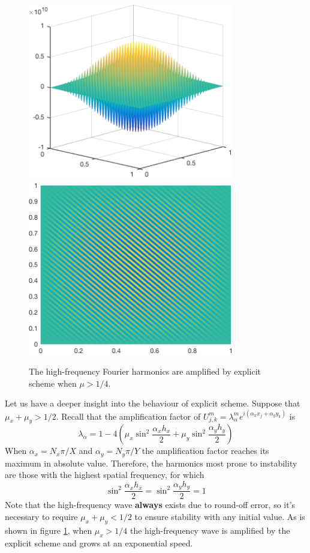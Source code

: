 \documentclass[12pt]{article}
\begin{document}
\begin{figure}[!htb]
\centerline{
	\includegraphics[width = 9cm]{explode_3D.png}
	\includegraphics[width = 9cm]{explode_flat.png}
}
\caption{The high-frequency Fourier harmonics are amplified by explicit scheme when $\mu > 1/4$.}
\label{figure:explode}
\end{figure}
Let us have a deeper insight into the behaviour of explicit scheme. Suppose that $\mu_x + \mu_y > 1/2$. Recall that the amplification factor of $U_{j,k}^m =\lambda_{\alpha}^me^{i(\alpha_xx_j+\alpha_yy_k)}$ is
$$
\lambda_\alpha = 1 - 4\left(\mu_x\sin^2\frac{\alpha_xh_x}{2}+\mu_y\sin^2\frac{\alpha_yh_y}{2}\right)
$$
When $\alpha_x = N_x \pi/X$ and $\alpha_y = N_y \pi/Y$ the amplification factor reaches its maximum in absolute value. Therefore, the harmonics most prone to instability are those
with the highest spatial frequency, for which
$$
\sin^2\frac{\alpha_xh_x}{2} = \sin^2\frac{\alpha_yh_y}{2} = 1
$$
Note that the high-frequency wave \textbf{always} exists due to round-off error, so it's necessary to require $\mu_x + \mu_y < 1/2$ to ensure stability with any initial value.
 As is shown in figure \ref{figure:explode}, when $\mu_x > 1/4$ the high-frequency wave is amplified by the explicit scheme and grows at an exponential speed. 
\end{document}
